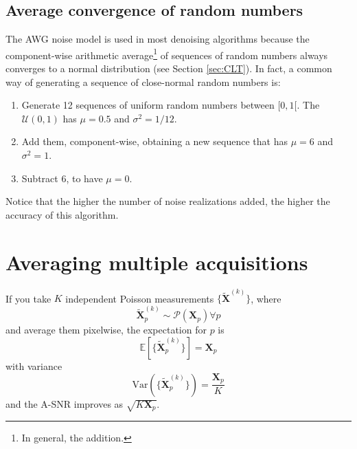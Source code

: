 \subsection{Average convergence of random numbers}
The \gls{AWG} noise model is used in most denoising algorithms because
the component-wise arithmetic average\footnote{In general, the
  addition.} of sequences of random numbers always converges to a
normal distribution (see Section \ref{sec:CLT}). In fact, a common way
of generating a sequence of close-normal random numbers is:
\begin{enumerate}
\item Generate 12 sequences of uniform random numbers between
  $[0, 1[$. The $\mathcal{U}(0,1)$ has $\mu=0.5$ and $\sigma^2=1/12$.
\item Add them, component-wise, obtaining a new sequence that has
  $\mu=6$ and $\sigma^2=1$.
\item Subtract $6$, to have $\mu=0$.
\end{enumerate}
Notice that the higher the number of noise realizations added, the
higher the accuracy of this algorithm.

\section{Averaging multiple acquisitions}
If you take $K$ independent Poisson measurements
$\{\tilde{\bm{X}}^{(k)}\}$, where
\begin{equation}
  \tilde{\bm{X}}_p^{(k)}\sim\mathcal{P}(\bm{X}_p)\forall p
\end{equation}
and average them pixelwise, the expectation for $p$ is
\begin{equation}
  \mathbb{E}[\{\tilde{\bm{X}}_p^{(k)}\}] = \bm{X}_p
\end{equation}
with variance
\begin{equation}
  \text{Var}(\{\tilde{\bm{X}}_p^{(k)}\}) = \frac{\bm{X}_p}{K}
\end{equation}
and the A-\gls{SNR} improves as $\sqrt{K\bm{X}_p}$.

